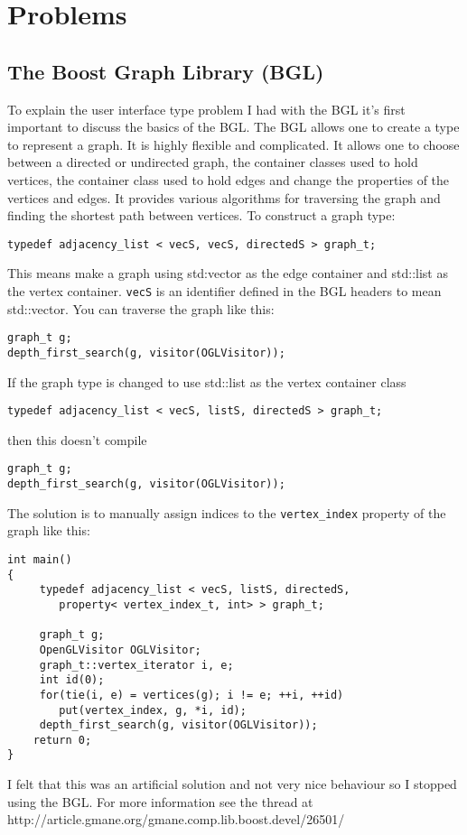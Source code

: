 \documentclass{article}
\begin{document}
\section{Problems}
\subsection{The Boost Graph Library (BGL)}
To explain the user interface type problem I had with the BGL it's first
important to discuss the basics of the BGL. The BGL allows one to create a type
to represent a graph. It is highly flexible and complicated. It allows one to
choose between a directed or undirected graph, the container classes used to
hold vertices, the container class used to hold edges and change the properties of the vertices
and edges. It provides various algorithms for traversing the graph and finding the 
shortest path between vertices.  
To construct a graph type:
\begin{verbatim}
typedef adjacency_list < vecS, vecS, directedS > graph_t;
\end{verbatim}
This means make a graph using std:vector as the edge container and std::list as
the vertex container. \verb|vecS| is an identifier defined in the BGL headers to
mean std::vector. You can traverse the graph like this:
\begin{verbatim}
graph_t g;
depth_first_search(g, visitor(OGLVisitor));
\end{verbatim}
If the graph type is changed to use std::list as the vertex container class
\begin{verbatim}
typedef adjacency_list < vecS, listS, directedS > graph_t;
\end{verbatim}
then this doesn't compile
\begin{verbatim}
graph_t g;
depth_first_search(g, visitor(OGLVisitor));
\end{verbatim}
The solution is to manually assign indices to the \verb|vertex_index| property
of the graph like this:
\begin{verbatim}
int main()
{	    
     typedef adjacency_list < vecS, listS, directedS,
        property< vertex_index_t, int> > graph_t;

     graph_t g;
     OpenGLVisitor OGLVisitor;
     graph_t::vertex_iterator i, e;
     int id(0);
     for(tie(i, e) = vertices(g); i != e; ++i, ++id)
        put(vertex_index, g, *i, id);
     depth_first_search(g, visitor(OGLVisitor));	    
    return 0;        
}    
\end{verbatim}
I felt that this was an artificial solution and not very nice behaviour so I
stopped using the BGL.  
For more information see the thread at 
http://article.gmane.org/gmane.comp.lib.boost.devel/26501/
\end{document}
